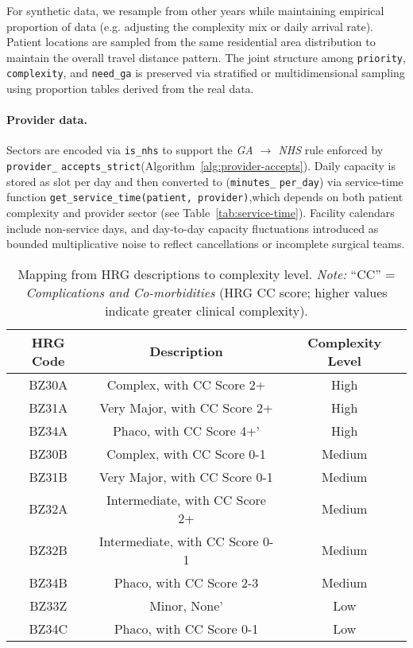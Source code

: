\documentclass[ %
                    author={Nattanan Nawakitbamrung},
                supervisor={Dr. Sébastien Rochat},
                    degree={MSc},
                     title={Developing and Evaluating the Impact of a Single Patient Treatment List (PTL) for an NHS Integrated Care System},
                  subtitle={},
                      type={},
                      year={2025}]{dissertation}
\begin{document}
For synthetic data, we resample from other years while maintaining empirical proportion of data (e.g. adjusting the complexity mix or daily arrival rate). Patient locations are sampled from the same residential area distribution to maintain the overall travel distance pattern. The joint structure among \texttt{priority}, \texttt{complexity}, and \texttt{need\_ga} is preserved via stratified or multidimensional sampling using proportion tables derived from the real data.

\paragraph{Provider data.} Sectors are encoded via \texttt{is\_nhs} to support the \textit{GA $\rightarrow$ NHS} rule enforced by \texttt{provider\_} \texttt{accepts\_strict}(Algorithm~\ref{alg:provider-accepts}). Daily capacity is stored as slot per day and then converted to (\texttt{minutes\_} \texttt{per\_day}) via service-time function \texttt{get\_service\_time(patient, provider)},which depends on both patient complexity and provider sector (see Table~\ref{tab:service-time}). Facility calendars include non-service days, and day-to-day capacity fluctuations introduced as bounded multiplicative noise to reflect cancellations or incomplete surgical teams.

\begin{table}[htbp]
\centering
\renewcommand{\arraystretch}{1.25}    
\setlength{\tabcolsep}{6pt}
\begin{tabular}{c{2.5cm} c{8.5cm} c{3.5cm}}
\hline
\textbf{HRG Code} & \textbf{Description} & \textbf{Complexity Level} \\
\hline
BZ30A & Complex, with CC Score 2+ &  High\\
BZ31A & Very Major, with CC Score 2+ & High\\
BZ34A & Phaco, with CC Score 4+' & High\\
BZ30B & Complex, with CC Score 0-1 & Medium\\
BZ31B & Very Major, with CC Score 0-1 & Medium\\
BZ32A & Intermediate, with CC Score 2+ & Medium\\
BZ32B & Intermediate, with CC Score 0-1 & Medium\\
BZ34B & Phaco, with CC Score 2-3 & Medium\\
BZ33Z & Minor, None' & Low\\
BZ34C & Phaco, with CC Score 0-1 & Low\\
\hline
\end{tabular}
\caption{Mapping from HRG descriptions to complexity level. \emph{Note:} ``CC'' = \textit{Complications and Co-morbidities} (HRG CC score; higher values indicate greater clinical complexity).}
\label{tab:comp-map}
\end{table}
\end{document}

